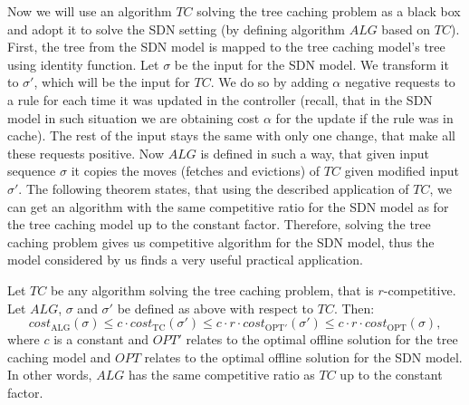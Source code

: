 Now we will use an algorithm $TC$ solving the tree caching problem as a black
box and adopt it to solve the SDN setting (by defining algorithm $ALG$ based on
$TC$). First, the tree from the SDN model is mapped to the tree caching model's
tree using identity function. Let $\sigma$ be the input for the SDN model. We
transform it to $\sigma'$, which will be the input for $TC$. We do so by adding
$\alpha$ negative requests to a rule for each time it was updated in the
controller (recall, that in the SDN model in such situation we are obtaining
cost $\alpha$ for the update if the rule was in cache). The rest of the input
stays the same with only one change, that make all these requests positive. Now
$ALG$ is defined in such a way, that given input sequence $\sigma$ it copies the
moves (fetches and evictions) of $TC$ given modified input $\sigma'$. The
following theorem states, that using the described application of $TC$, we can
get an algorithm with the same competitive ratio for the SDN model as for the
tree caching model up to the constant factor. Therefore, solving the tree
caching problem gives us competitive algorithm for the SDN model, thus the model
considered by us finds a very useful practical application.  \begin{theorem} Let
$TC$ be any algorithm solving the tree caching problem, that is $r$-competitive.
Let $ALG$, $\sigma$ and $\sigma'$ be defined as above with respect to $TC$.
Then: $$cost_{\mathrm{ALG}}(\sigma) \leq c \cdot cost_{\mathrm{TC}}(\sigma')
\leq c \cdot r \cdot cost_{\mathrm{OPT'}}(\sigma') \leq c \cdot r \cdot
cost_{\mathrm{OPT}}(\sigma),$$ where $c$ is a constant and $OPT'$ relates to the
optimal offline solution for the tree caching model and $OPT$ relates to the
optimal offline solution for the SDN model. In other words, $ALG$ has the same
competitive ratio as $TC$ up to the constant factor.  \end{theorem}
